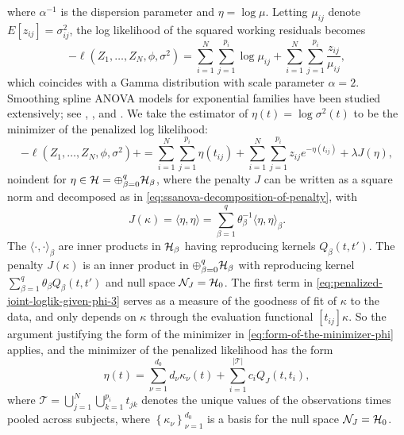 \noindent
where $\alpha^{-1}$ is the dispersion parameter and $\eta = \log \mu$. Letting $\mu_{ij}$ denote $E\left[ z_{ij} \right] = \sigma_{ij}^2$, the log likelihood of the squared working residuals becomes 
\begin{equation} \label{eq:penalized-joint-loglik-given-phi-3}
-\ell\left( Z_1,\dots, Z_N, \phi, \sigma^2 \right) =  \sum_{i = 1}^N \sum_{j = 1}^{p_i} \log \mu_{ij}  + \sum_{i = 1}^N \sum_{j = 1}^{p_i} \frac {z_{ij}}{\mu_{ij}},
\end{equation}
\noindent
which coincides with a Gamma distribution with scale parameter $\alpha = 2$. Smoothing spline ANOVA models for exponential families have been studied extensively; see \cite{wahba1995smoothing}, \cite{wang1997grkpack}, and \cite{gu2013smoothing}. We take the estimator of $\eta\left(t\right) = \log\sigma^2\left(t\right)$ to be the minimizer of the penalized log likelihood:
\begin{equation} \label{eq:penalized-joint-loglik-given-phi-3}
-\ell\left( Z_1,\dots, Z_N, \phi, \sigma^2 \right) + =  \sum_{i = 1}^N \sum_{j = 1}^{p_i} \eta\left(t_{ij}\right)  + \sum_{i = 1}^N \sum_{j = 1}^{p_i} z_{ij} e^{-\eta\left(t_{ij}\right)} + \lambda J\left(\eta\right),  
\end{equation}
noindent
for $\eta \in \mathcal{H} = \oplus_{\beta = 0}^q \mathcal{H}_\beta$, where the penalty $J$ can be written as a square norm and decomposed as in \eqref{eq:ssanova-decomposition-of-penalty}, with
\begin{equation*} 
J\left(\kappa \right) = \langle \eta,\eta \rangle = \sum_{\beta = 1}^q \theta_\beta^{-1}\langle \eta,\eta \rangle_{\beta}.
\end{equation*}
\noindent 
The $\langle \cdot, \cdot \rangle_{\beta}$ are inner products in $\mathcal{H}_\beta$ having reproducing kernels $Q_\beta\left(t,t'\right)$. The penalty $J\left(\kappa\right)$ is an inner product in $\oplus_{\beta = 0}^q \mathcal{H}_\beta$ with reproducing kernel $\sum_{\beta=1}^q \theta_\beta Q_\beta\left(t, t'\right)$ and null space $\mathcal{N}_J = \mathcal{H}_0$. The first term in \eqref{eq:penalized-joint-loglik-given-phi-3} serves as a measure of the goodness of fit of $\kappa$ to the data, and only depends on $\kappa$ through the evaluation functional $\left[t_{ij}\right]\kappa$. So the argument justifying the form of the minimizer in \eqref{eq:form-of-the-minimizer-phi} applies, and the minimizer of the penalized likelihood has the form 
\begin{equation} \label{eq:form-of-smoothing-spline-solution-kappa}
\eta\left( t \right) = \sum_{\nu = 1}^{d_0} d_\nu\kappa_\nu\left( t \right) + \sum_{i = 1}^{\vert \mathcal{T} \vert} c_i Q_J\left( t, t_i \right),
\end{equation}  
\noindent
where $\mathcal{T} = \bigcup_{j=1}^N\bigcup_{k=1}^{p_i} t_{jk}$ denotes the unique values of the observations times pooled across subjects, where $\left\{\kappa_\nu \right\}_{\nu=1}^{d_0}$ is a basis for the null space $\mathcal{N}_J = \mathcal{H}_0$. 

